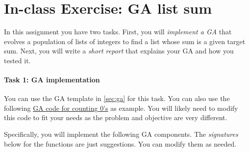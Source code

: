 \documentclass[oneside,11pt,dvipsnames]{book}
\begin{document}
\section{In-class Exercise: GA list sum}
In this assignment you have two tasks. First, you will \emph{implement a GA} that evolves a population of lists of integers to find a list whose sum is a given target sum. Next, you will write a \emph{short report} that explains your GA and how you tested it.

\paragraph{Task 1: GA implementation}

 You can use the GA template in \autoref{sec:ga} for this task. You can also use the following \href{https://nguyenthanhvuh.github.io/class-oo/ga-example.py}{GA code for counting 0's} as example. You will likely need to modify this code to fit your needs as the problem and objective are very different.
 
 
 Specifically, you will implement the following GA components. The \emph{signatures} below for the functions are just suggestions. You can modify them as needed.
\end{document}
